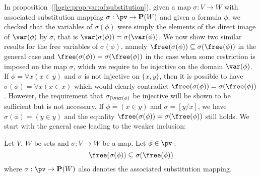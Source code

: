 In proposition~(\ref{logic:prop:var:of:substitution}), given a map
$\sigma:V\to W$ with associated substitution mapping
$\sigma:\pv\to{\bf P}(W)$ and given a formula $\phi$, we checked
that the variables of $\sigma(\phi)$ were simply the elements of the
direct image of $\var(\phi)$ by $\sigma$, that is
$\var(\sigma(\phi))=\sigma(\var(\phi))$. We now show two similar
results for the free variables of $\sigma(\phi)$, namely
$\free(\sigma(\phi))\subseteq\sigma(\free(\phi))$ in the general
case and $\free(\sigma(\phi))=\sigma(\free(\phi))$ in the case when
some restriction is imposed on the map $\sigma$, which we require to
be injective on the domain $\var(\phi)$. If $\phi=\forall x(x\in y)$
and $\sigma$ is not injective on $\{x,y\}$, then it is possible to
have $\sigma(\phi)=\forall x(x\in x)$ which would clearly contradict
$\free(\sigma(\phi))=\sigma(\free(\phi))$. However, the requirement
that $\sigma_{|\var(\phi)}$ be injective will be shown to be
sufficient but is not necessary. If $\phi=(x\in y)$ and
$\sigma=[y/x]$, we have $\sigma(\phi)=(y\in y)$ and the equality
$\free(\sigma(\phi))=\sigma(\free(\phi))$ still holds. We start with
the general case leading to the weaker inclusion:
\begin{prop}\label{logic:prop:freevar:of:substitution:inclusion}
Let $V$, $W$ be sets and $\sigma:V\to W$ be a map. Let
$\phi\in\pv$\,:
    \[
    \free(\sigma(\phi))\subseteq\sigma(\free(\phi))
    \]
where $\sigma:\pv\to{\bf P}(W)$ also denotes the associated
substitution mapping.
\end{prop}

